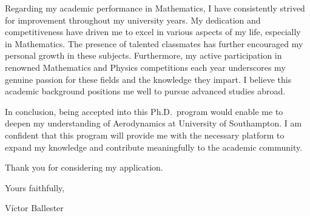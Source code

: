 \documentclass{letter}
\newcommand{\uni}{University of Southampton}
\begin{document}
\begin{letter}
  Regarding my academic performance in Mathematics, I have consistently strived for improvement throughout my university years. My dedication and competitiveness have driven me to excel in various aspects of my life, especially in Mathematics. The presence of talented classmates has further encouraged my personal growth in these subjects. Furthermore, my active participation in renowned Mathematics and Physics competitions each year underscores my genuine passion for these fields and the knowledge they impart. I believe this academic background positions me well to pursue advanced studies abroad.


  In conclusion, being accepted into this Ph.D.\ program would enable me to deepen my understanding of Aerodynamics at \uni. I am confident that this program will provide me with the necessary platform to expand my knowledge and contribute meaningfully to the academic community.

  Thank you for considering my application.
  \bigskip

  Yours faithfully,

  Víctor Ballester

\end{letter}
\end{document}
